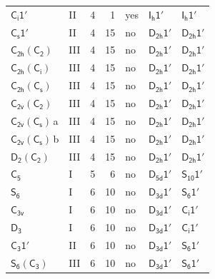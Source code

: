 \documentclass[10pt,a4paper]{article}
\numberwithin{equation}{section}
\newcommand{\grp}[1]{\mathsf{#1}}
\newcommand{\clsletter}[1]{\,{\scriptsize\color{black!55}#1}}
\begin{document}
{\begin{longtable}{@{}llrrlll@{}}
\href{S2-1p.pdf}{$\grp{C_{i}1'}$} & II & 4 & 1 & yes & \href{Ih-1p.pdf}{$\grp{I_{h}1'}$} & \href{Ih-1p.pdf}{$\grp{I_{h}1'}$}\\
\href{C1v-1p.pdf}{$\grp{C_{s}1'}$} & II & 4 & 15 & no & \href{D2h-1p.pdf}{$\grp{D_{2h}1'}$} & \href{D2h-1p.pdf}{$\grp{D_{2h}1'}$}\\
\href{C2h-C2.pdf}{$\grp{C_{2h}}(\grp{C_{2}})$} & III & 4 & 15 & no & \href{D2h-1p.pdf}{$\grp{D_{2h}1'}$} & \href{D2h-1p.pdf}{$\grp{D_{2h}1'}$}\\
\href{C2h-S2.pdf}{$\grp{C_{2h}}(\grp{C_{i}})$} & III & 4 & 15 & no & \href{D2h-1p.pdf}{$\grp{D_{2h}1'}$} & \href{D2h-1p.pdf}{$\grp{D_{2h}1'}$}\\
\href{C2h-C1v.pdf}{$\grp{C_{2h}}(\grp{C_{s}})$} & III & 4 & 15 & no & \href{D2h-1p.pdf}{$\grp{D_{2h}1'}$} & \href{D2h-1p.pdf}{$\grp{D_{2h}1'}$}\\
\href{C2v-C2.pdf}{$\grp{C_{2v}}(\grp{C_{2}})$} & III & 4 & 15 & no & \href{D2h-1p.pdf}{$\grp{D_{2h}1'}$} & \href{D2h-1p.pdf}{$\grp{D_{2h}1'}$}\\
\href{C2v-C1v.pdf}{$\grp{C_{2v}}(\grp{C_{s}})$}\clsletter{a} & III & 4 & 15 & no & \href{D2h-1p.pdf}{$\grp{D_{2h}1'}$} & \href{D2h-1p.pdf}{$\grp{D_{2h}1'}$}\\
\href{C2v-C1v.pdf}{$\grp{C_{2v}}(\grp{C_{s}})$}\clsletter{b} & III & 4 & 15 & no & \href{D2h-1p.pdf}{$\grp{D_{2h}1'}$} & \href{D2h-1p.pdf}{$\grp{D_{2h}1'}$}\\
\href{D2-C2.pdf}{$\grp{D_{2}}(\grp{C_{2}})$} & III & 4 & 15 & no & \href{D2h-1p.pdf}{$\grp{D_{2h}1'}$} & \href{D2h-1p.pdf}{$\grp{D_{2h}1'}$}\\
\href{../../../rotation/data/pdf/C5.pdf}{$\grp{C_{5}}$} & I & 5 & 6 & no & \href{D5d-1p.pdf}{$\grp{D_{5d}1'}$} & \href{S10-1p.pdf}{$\grp{S_{10}1'}$}\\
\href{../../../rotation/data/pdf/S6.pdf}{$\grp{S_{6}}$} & I & 6 & 10 & no & \href{D3d-1p.pdf}{$\grp{D_{3d}1'}$} & \href{S6-1p.pdf}{$\grp{S_{6}1'}$}\\
\href{../../../rotation/data/pdf/C3v.pdf}{$\grp{C_{3v}}$} & I & 6 & 10 & no & \href{D3d-1p.pdf}{$\grp{D_{3d}1'}$} & \href{S2-1p.pdf}{$\grp{C_{i}1'}$}\\
\href{../../../rotation/data/pdf/D3.pdf}{$\grp{D_{3}}$} & I & 6 & 10 & no & \href{D3d-1p.pdf}{$\grp{D_{3d}1'}$} & \href{S2-1p.pdf}{$\grp{C_{i}1'}$}\\
\href{C3-1p.pdf}{$\grp{C_{3}1'}$} & II & 6 & 10 & no & \href{D3d-1p.pdf}{$\grp{D_{3d}1'}$} & \href{S6-1p.pdf}{$\grp{S_{6}1'}$}\\
\href{S6-C3.pdf}{$\grp{S_{6}}(\grp{C_{3}})$} & III & 6 & 10 & no & \href{D3d-1p.pdf}{$\grp{D_{3d}1'}$} & \href{S6-1p.pdf}{$\grp{S_{6}1'}$}\\

\end{longtable}}
\end{document}

